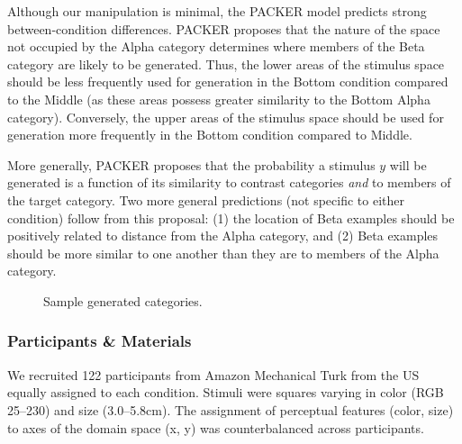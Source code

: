 \documentclass[10pt,letterpaper]{article}
\newcommand\inputpgf[2]{{
\let\pgfimageWithoutPath\pgfimage
\renewcommand{\pgfimage}[2][]{\pgfimageWithoutPath[##1]{#1/##2}}

}}
\begin{document}

Although our manipulation is minimal, the PACKER model predicts strong between-condition differences. PACKER proposes that the nature of the space not occupied by the Alpha category determines where members of the Beta category are likely to be generated. Thus, the lower areas of the stimulus space should be less frequently used for generation in the Bottom condition compared to the Middle (as these areas possess greater similarity to the Bottom Alpha category). Conversely, the upper areas of the stimulus space should be used for generation more frequently in the Bottom condition compared to Middle.


More generally, PACKER proposes that the probability a stimulus $y$ will be generated is a function of its similarity to contrast categories \textit{and} to members of the target category. Two more general predictions (not specific to either condition) follow from this proposal: (1) the location of Beta examples should be positively related to distance from the Alpha category, and (2) Beta examples should be more similar to one another than they are to members of the Alpha category.

\begin{figure}
    \begin{center}
    \inputpgf{figs/}{beta.samples.pgf}
    \caption{Sample generated categories. }
    \label{fig:beta.samples}
    \end{center}
\end{figure}

\subsubsection{Participants \& Materials}
We recruited 122 participants from Amazon Mechanical Turk from the US equally assigned to each condition. Stimuli were squares varying in color (RGB 25--230) and size (3.0--5.8cm). The assignment of perceptual features (color, size) to axes of the domain space (x, y) was counterbalanced across participants.
\end{document}
